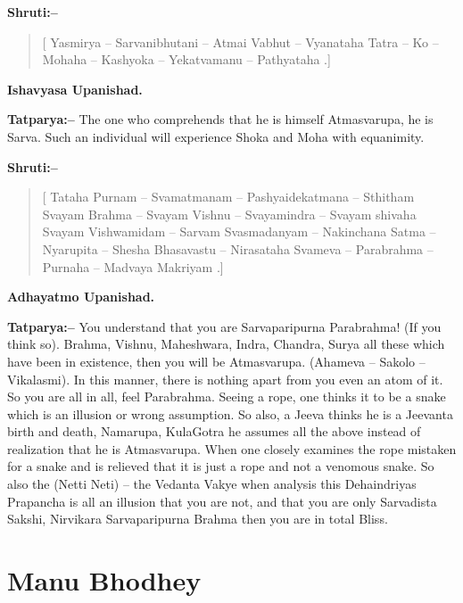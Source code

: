 \textbf{Shruti:–}

\begin{verse}
[ Yasmirya – Sarvanibhutani – Atmai Vabhut – Vyanataha  Tatra – Ko – Mohaha – Kashyoka – Yekatvamanu – Pathyataha .]
\end{verse}

\begin{flushright}
\textbf{Ishavyasa Upanishad.}
\end{flushright}

\textbf{Tatparya:–} The one who comprehends that he is himself Atmasvarupa, he is Sarva. Such an individual will experience Shoka and Moha with equanimity.

\textbf{Shruti:–}

\begin{verse}
[ Tataha Purnam – Svamatmanam – Pashyaidekatmana – Sthitham  Svayam Brahma – Svayam Vishnu – Svayamindra – Svayam shivaha  Svayam Vishwamidam – Sarvam Svasmadanyam – Nakinchana  Satma – Nyarupita – Shesha Bhasavastu – Nirasataha  Svameva – Parabrahma – Purnaha – Madvaya Makriyam .]
\end{verse}

\begin{flushright}
\textbf{Adhayatmo Upanishad.}
\end{flushright}

\textbf{Tatparya:–} You understand that you are Sarvaparipurna Parabrahma! (If you think so). Brahma, Vishnu, Maheshwara, Indra, Chandra, Surya all these which have been in existence, then you will be Atmasvarupa. (Ahameva – Sakolo – Vikalasmi). In this manner, there is nothing apart from you even an atom of it. So you are all in all, feel Parabrahma. Seeing a rope, one thinks it to be a snake which is an illusion or wrong assumption. So also, a Jeeva thinks he is a Jeevanta birth and death, Namarupa, KulaGotra he assumes all the above instead of realization that he is Atmasvarupa. When one closely examines the rope mistaken for a snake and is relieved that it is just a rope and not a venomous snake. So also the (Netti Neti) – the Vedanta Vakye when analysis this Dehaindriyas Prapancha is all an illusion that you are not, and that you are only Sarvadista Sakshi, Nirvikara Sarvaparipurna Brahma then you are in total Bliss.

\chapter{Manu Bhodhey}

